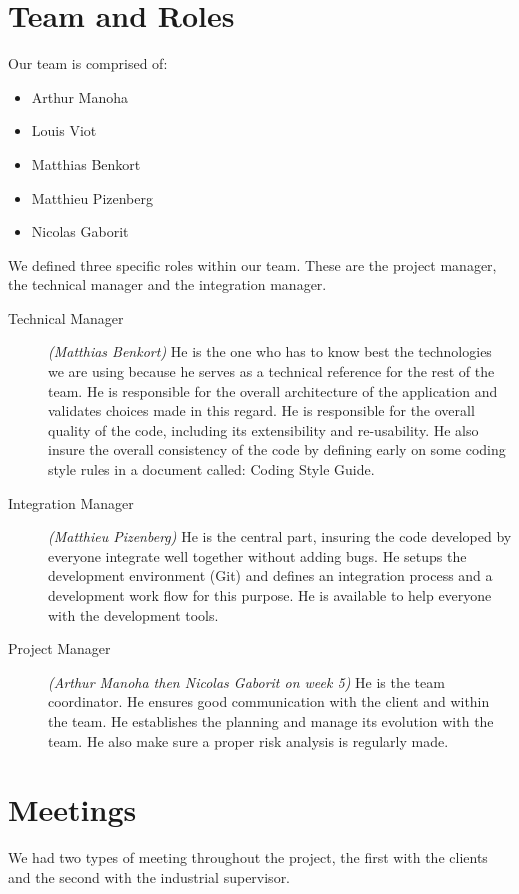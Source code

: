 \section{Team and Roles}

Our team  is comprised of:
\begin{itemize}
\item Arthur Manoha
\item Louis Viot
\item Matthias Benkort
\item Matthieu Pizenberg
\item Nicolas Gaborit
\end{itemize}


We defined three specific roles within our team. These are the project
manager, the technical manager and the integration manager.

\begin{description}
\item[Technical Manager] \emph{(Matthias Benkort)} He is the one who
  has to know best the technologies we are using because he serves as
  a technical reference for the rest of the team. He is responsible
  for the overall architecture of the application and validates
  choices made in this regard. He is responsible for the overall
  quality of the code, including its extensibility and re-usability. He
  also insure the overall consistency of the code by defining early on
  some coding style rules in a document called: Coding Style Guide.

\item[Integration Manager] \emph{(Matthieu Pizenberg)} He is the
  central part, insuring the code developed by everyone integrate well
  together without adding bugs. He setups the development environment
  (Git) and defines an integration process and a development work flow
  for this purpose. He is available to help everyone with the
  development tools.

\item[Project Manager] \emph{(Arthur Manoha then Nicolas Gaborit on
    week 5)} He is the team coordinator. He ensures good communication
  with the client and within the team. He establishes the planning and
  manage its evolution with the team. He also make sure a proper risk
  analysis is regularly made.
\end{description}


\section{Meetings}
We had two types of meeting throughout the project, the first with the
clients and the second with the industrial supervisor.


